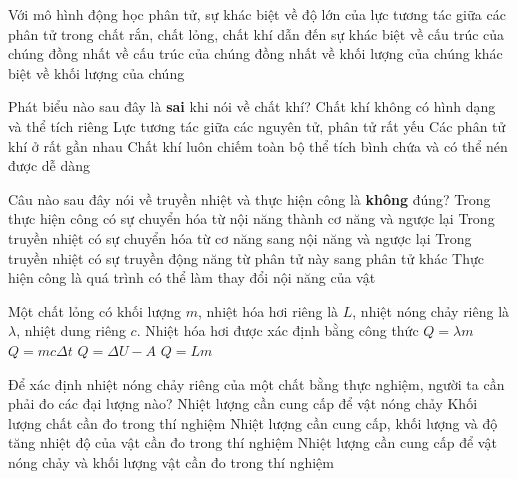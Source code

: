 	\begin{ex}%
		Với mô hình động học phân tử, sự khác biệt về độ lớn của lực tương tác giữa các phân tử trong chất rắn, chất lỏng, chất khí dẫn đến sự
		\choice
		{\True khác biệt về cấu trúc của chúng}
		{đồng nhất về cấu trúc của chúng}
		{đồng nhất về khối lượng của chúng}
		{khác biệt về khối lượng của chúng}
	\end{ex}

	\begin{ex}%
		Phát biểu nào sau đây là \textbf{sai} khi nói về chất khí?
		\choice
		{Chất khí không có hình dạng và thể tích riêng}
		{Lực tương tác giữa các nguyên tử, phân tử rất yếu}
		{\True Các phân tử khí ở rất gần nhau}
		{Chất khí luôn chiếm toàn bộ thể tích bình chứa và có thể nén được dễ dàng}
	\end{ex}

	\begin{ex}%
		Câu nào sau đây nói về truyền nhiệt và thực hiện công là \textbf{không} đúng?
		\choice
		{Trong thực hiện công có sự chuyển hóa từ nội năng thành cơ năng và ngược lại}
		{\True Trong truyền nhiệt có sự chuyển hóa từ cơ năng sang nội năng và ngược lại}
		{Trong truyền nhiệt có sự truyền động năng từ phân tử này sang phân tử khác}
		{Thực hiện công là quá trình có thể làm thay đổi nội năng của vật}
	\end{ex}

	\begin{ex}%
		Một chất lỏng có khối lượng $m$, nhiệt hóa hơi riêng là $L$, nhiệt nóng chảy riêng là $\lambda$, nhiệt dung riêng $c$. Nhiệt hóa hơi được xác định bằng công thức
		\choice
		{$Q=\lambda m$}
		{$Q=mc\Delta t$}
		{$Q=\Delta U-A$}
		{\True $Q=Lm$}
	\end{ex}

	\begin{ex}%
		Để xác định nhiệt nóng chảy riêng của một chất bằng thực nghiệm, người ta cần phải đo các đại lượng nào?
		\choice
		{Nhiệt lượng cần cung cấp để vật nóng chảy}
		{Khối lượng chất cần đo trong thí nghiệm}
		{Nhiệt lượng cần cung cấp, khối lượng và độ tăng nhiệt độ của vật cần đo trong thí nghiệm}
		{\True Nhiệt lượng cần cung cấp để vật nóng chảy và khối lượng vật cần đo trong thí nghiệm}
	\end{ex}

